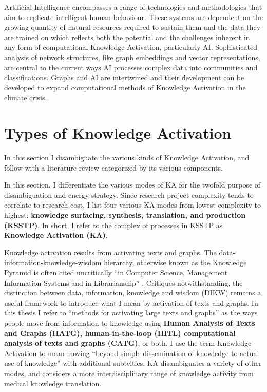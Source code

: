 Artificial Intelligence encompasses a range of technologies and methodologies that aim to replicate intelligent human behaviour. These systems are dependent on the growing quantity of natural resources required to sustain them and the data they are trained on which reflects both the potential and the challenges inherent in any form of computational Knowledge Activation, particularly AI. Sophisticated analysis of network structures, like graph embeddings and vector representations, are central to the current ways AI processes complex data into communities and classifications. Graphs and AI are intertwined and their development can be developed to expand computational methods of Knowledge Activation in the climate crisis. 


\section{Types of Knowledge Activation}

In this section I disambiguate the various kinds of Knowledge Activation, and follow with a literature review categorized by its various components.

In this section, I differentiate the various modes of KA for the twofold purpose of disambiguation and energy strategy. Since research project complexity tends to correlate to research cost, I list four various KA modes from lowest complexity to highest: \textbf{knowledge surfacing, synthesis, translation, and production (KSSTP)}. In short, I refer to the complex of processes in KSSTP as \textbf{Knowledge Activation (KA)}.

Knowledge activation results from activating texts and graphs. The data-information-knowledge-wisdom hierarchy, otherwise known as the Knowledge Pyramid is often cited uncritically “in Computer Science, Management Information Systems and in Librarianship” \citep{fricke_knowledge_2009}. Critiques notwithstanding, the distinction between data, information, knowledge and wisdom (DIKW) remains a useful framework to introduce what I mean by activation of texts and graphs. In this thesis I refer to “methods for activating large texts and graphs” as the ways people move from information to knowledge using \textbf{Human Analysis of Texts and Graphs (HATG), human-in-the-loop (HITL) computational analysis of texts and graphs (CATG)}, or both. I use the term Knowledge Activation to mean moving “beyond simple dissemination of knowledge to actual use of knowledge” \citep[p. 4]{straus_knowledge_2009-1} with additional subtelties. KA disambiguates a variety of other modes, and considers a more interdisciplinary range of knowledge activity from medical knowledge translation. 




